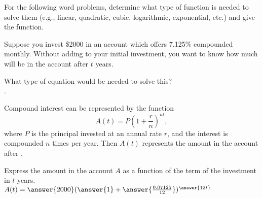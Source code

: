 \documentclass{ximera}
\author{Elizabeth Campolongo}
\begin{document}
\begin{exercise}
For the following word problems, determine what type of function is needed to solve them (e.g., linear, quadratic, cubic, logarithmic, exponential, etc.) and give the function. 
%

\item Suppose you invest \$2000 in an account which offers 7.125\% compounded monthly. Without adding to your initial investment, you want to know how much will be in the account after $t$ years. 

What type of equation would be needed to solve this?\\
.
\begin{exercise}
Compound interest can be represented by the function
$$A(t) = P\left(1+\frac{r}{n}\right)^{nt},$$
where $P$ is the principal invested at an annual rate $r$, and the interest is compounded $n$ times per year. Then $A(t)$ represents the amount in the account after
%
.

\begin{exercise}
Express the amount in the account $A$ as a function of the term of the investment in $t$ years.\\
$A(t) = \answer{2000}(\answer{1}+ \answer{\frac{0.07125}{12}})^{\answer{12t}}$
\end{exercise}
\end{exercise}



\end{exercise}
\end{document}
